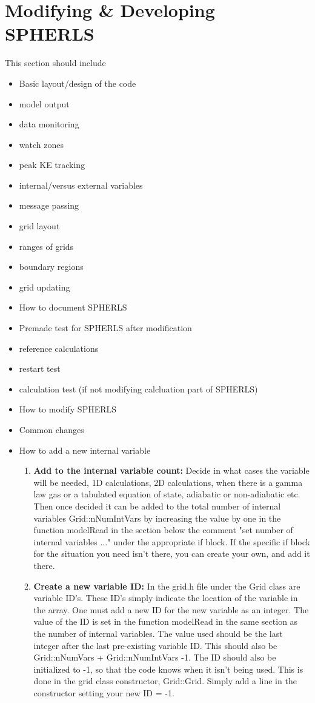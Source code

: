 \documentclass[12pt,a4paper]{book}
\begin{document}
\chapter{Modifying \& Developing SPHERLS}
This section should include
\begin{itemize}
\item Basic layout/design of the code
\item model output
\item data monitoring
\item watch zones
\item peak KE tracking
\item internal/versus external variables
\item message passing
\item grid layout
\item ranges of grids
\item boundary regions
\item grid updating
\item How to document SPHERLS
\item Premade test for SPHERLS after modification
\item reference calculations
\item restart test
\item calculation test (if not modifying calcluation part of SPHERLS)
\item How to modify SPHERLS
\item Common changes
\item How to add a new internal variable
\begin{enumerate}
\item \textbf{Add to the internal variable count:} Decide in what cases the variable will be needed, 1D calculations, 2D calculations, when there is a gamma law gas or a tabulated equation of state, adiabatic or non-adiabatic etc. Then once decided it can be added to the total number of internal variables Grid::nNumIntVars by increasing the value by one in the function modelRead in the section below the comment "set number of internal variables ..." under the appropriate if block. If the specific if block for the situation you need isn't there, you can create your own, and add it there.
\item \textbf{Create a new variable ID:} In the grid.h file under the Grid class are variable ID's. These ID's simply indicate the location of the variable in the array. One must add a new ID for the new variable as an integer. The value of the ID is set in the function modelRead in the same section as the number of internal variables. The value used should be the last integer after the last pre-existing variable ID. This should also be Grid::nNumVars + Grid::nNumIntVars -1. The ID should also be initialized to -1, so that the code knows when it isn't being used. This is done in the grid class constructor, Grid::Grid. Simply add a line in the constructor setting your new ID = -1.

\end{enumerate}
\end{itemize}
\end{document}
